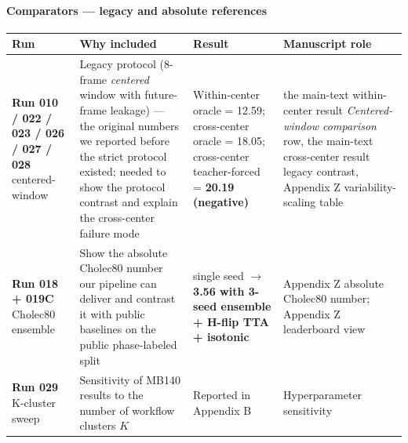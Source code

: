 \paragraph{Comparators --- legacy and absolute
references}\label{comparators-legacy-and-absolute-references}

\begin{longtable}[]{@{}
  >{\raggedright\arraybackslash}p{}
  >{\raggedright\arraybackslash}p{}
  >{\raggedright\arraybackslash}p{}
  >{\raggedright\arraybackslash}p{}@{}}
\toprule\noalign{}
\begin{minipage}[b]{\linewidth}\raggedright
Run
\end{minipage} & \begin{minipage}[b]{\linewidth}\raggedright
Why included
\end{minipage} & \begin{minipage}[b]{\linewidth}\raggedright
Result
\end{minipage} & \begin{minipage}[b]{\linewidth}\raggedright
Manuscript role
\end{minipage} \\
\midrule\noalign{}
\endhead
\bottomrule\noalign{}
\endlastfoot
\textbf{Run 010 / 022 / 023 / 026 / 027 / 028} centered-window & Legacy
protocol (8-frame \emph{centered} window with future-frame leakage) ---
the original numbers we reported before the strict protocol existed;
needed to show the protocol contrast and explain the cross-center
failure mode & Within-center oracle = 12.59; cross-center oracle =
18.05; cross-center teacher-forced = \textbf{20.19 (negative)} & the main-text within-center result
\emph{Centered-window comparison} row, the main-text cross-center result legacy contrast, Appendix Z
variability-scaling table \\
\textbf{Run 018 + 019C} Cholec80 ensemble & Show the absolute Cholec80
number our pipeline can deliver and contrast it with public baselines on
the public phase-labeled split & 4.46 single seed $\rightarrow$ \textbf{3.56 with
3-seed ensemble + H-flip TTA + isotonic} & Appendix Z absolute Cholec80
number; Appendix Z leaderboard view \\
\textbf{Run 029} K-cluster sweep & Sensitivity of MB140 results to the
number of workflow clusters \(K\) & Reported in Appendix B &
Hyperparameter sensitivity \\
\end{longtable}

